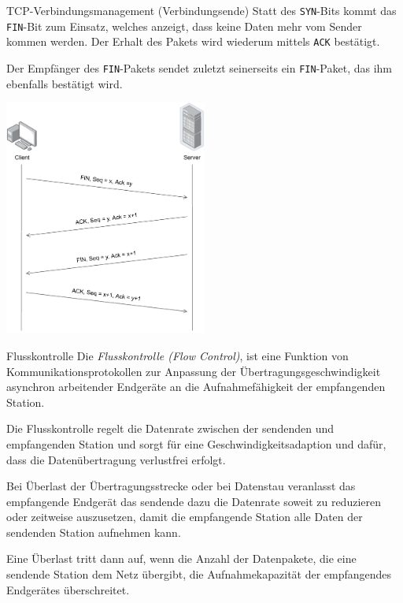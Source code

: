 \begin{defi}{TCP-Verbindungsmanagement (Verbindungsende)}
    Statt des \texttt{SYN}-Bits kommt das \texttt{FIN}-Bit  zum Einsatz, welches anzeigt, dass keine Daten mehr vom Sender kommen werden.
    Der Erhalt des Pakets wird wiederum mittels \texttt{ACK} bestätigt.

    Der Empfänger des \texttt{FIN}-Pakets sendet zuletzt seinerseits ein \texttt{FIN}-Paket, das ihm ebenfalls bestätigt wird.

    \centering
    \includegraphics[width=0.5\textwidth]{includes/figures/defi_tcp_verbindungsabbau.pdf}
\end{defi}

\begin{defi}{Flusskontrolle}
    Die \emph{Flusskontrolle (Flow Control)}, ist eine Funktion von Kommunikationsprotokollen zur Anpassung der Übertragungsgeschwindigkeit asynchron arbeitender Endgeräte an die Aufnahmefähigkeit der empfangenden Station.

    Die Flusskontrolle regelt die Datenrate zwischen der sendenden und empfangenden Station und sorgt für eine Geschwindigkeitsadaption und dafür, dass die Datenübertragung verlustfrei erfolgt.

    Bei Überlast der Übertragungsstrecke oder bei Datenstau veranlasst das empfangende Endgerät das sendende dazu die Datenrate soweit zu reduzieren oder zeitweise auszusetzen, damit die empfangende Station alle Daten der sendenden Station aufnehmen kann.

    Eine Überlast tritt dann auf, wenn die Anzahl der Datenpakete, die eine sendende Station dem Netz übergibt, die Aufnahmekapazität der empfangendes Endgerätes überschreitet.
\end{defi}


